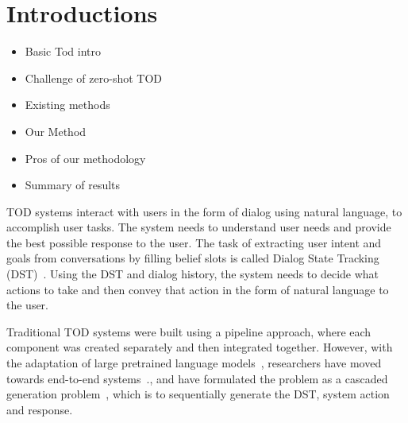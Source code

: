 \section{Introductions}
\begin{itemize}
    \item Basic Tod intro
    \item Challenge of zero-shot TOD
    \item Existing methods
    \item Our Method
    \item Pros of our methodology
    \item Summary of results
\end{itemize}

TOD systems interact with users in the form of dialog using natural language, to accomplish user tasks.
The system needs to understand user needs and provide the best possible response to the user.
The task of extracting user intent and goals from conversations by filling belief slots is called Dialog State Tracking (DST)~\cite{wang-etal-2016-inner}.
Using the DST and dialog history, the system needs to decide what actions to take and then convey that action in the form of natural language to the user.

Traditional TOD systems were built using a pipeline approach, where each component was created separately and then integrated together.
However, with the adaptation of large pretrained language models~\cite{Devlin2019BERTPO,Radford2019LanguageMA},
researchers have moved towards end-to-end systems~\cite{HosseiniAsl2020ASL,Peng2021SoloistBT,Lee2020SUMBTLaRLEN,Yang2020UBARTF,Jeon2021DORATP,Sun2022BORTBA,Yang2022UBARv2TM,Noroozi2020AFA}.,
and have formulated the problem as a cascaded generation problem~\cite{su2021multi}, which is to sequentially generate the DST, system action and response.

